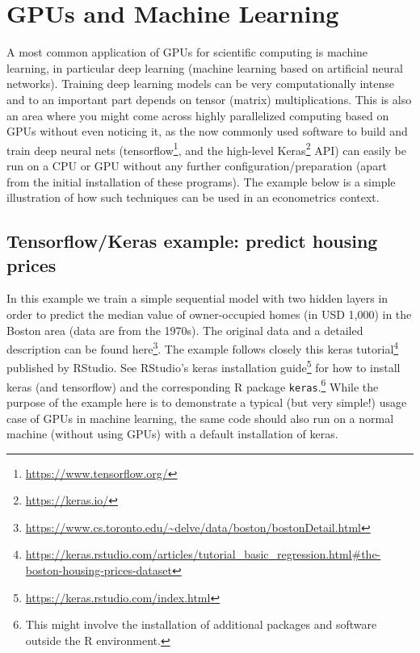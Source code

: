 \documentclass[
  12pt,
]{style/krantz}
\renewcommand{\href}[2]{#2\footnote{\url{#1}}}
\begin{document}
\hypertarget{gpus-and-machine-learning}{%
\chapter{GPUs and Machine Learning}\label{gpus-and-machine-learning}}

A most common application of GPUs for scientific computing is machine learning, in particular deep learning (machine learning based on artificial neural networks). Training deep learning models can be very computationally intense and to an important part depends on tensor (matrix) multiplications. This is also an area where you might come across highly parallelized computing based on GPUs without even noticing it, as the now commonly used software to build and train deep neural nets (\href{https://www.tensorflow.org/}{tensorflow}, and the high-level \href{https://keras.io/}{Keras} API) can easily be run on a CPU or GPU without any further configuration/preparation (apart from the initial installation of these programs). The example below is a simple illustration of how such techniques can be used in an econometrics context.

\hypertarget{tensorflowkeras-example-predict-housing-prices}{%
\section{Tensorflow/Keras example: predict housing prices}\label{tensorflowkeras-example-predict-housing-prices}}

In this example we train a simple sequential model with two hidden layers in order to predict the median value of owner-occupied homes (in USD 1,000) in the Boston area (data are from the 1970s). The original data and a detailed description can be found \href{https://www.cs.toronto.edu/~delve/data/boston/bostonDetail.html}{here}. The example follows closely \href{https://keras.rstudio.com/articles/tutorial_basic_regression.html\#the-boston-housing-prices-dataset}{this keras tutorial} published by RStudio. See \href{https://keras.rstudio.com/index.html}{RStudio's keras installation guide} for how to install keras (and tensorflow) and the corresponding R package \texttt{keras}.\footnote{This might involve the installation of additional packages and software outside the R environment.} While the purpose of the example here is to demonstrate a typical (but very simple!) usage case of GPUs in machine learning, the same code should also run on a normal machine (without using GPUs) with a default installation of keras.
\end{document}
